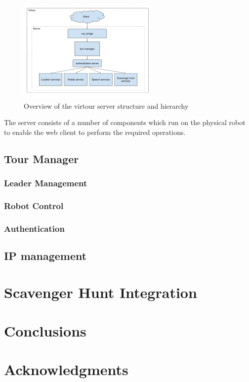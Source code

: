\documentclass{sig-alternate-05-2015}
\begin{document}
\begin{figure}
\centering
\includegraphics[height=2in]{virtour_server}
\caption{Overview of the virtour server structure and hierarchy}
\end{figure}

The server consists of a number of components which run on the physical robot
to enable the web client to perform the required operations.

\subsection{Tour Manager}

\subsubsection{Leader Management}

\subsubsection{Robot Control}

\subsubsection{Authentication}

\subsection{IP management}

\section{Scavenger Hunt Integration}

\section{Conclusions}

\section{Acknowledgments}


\end{document}
